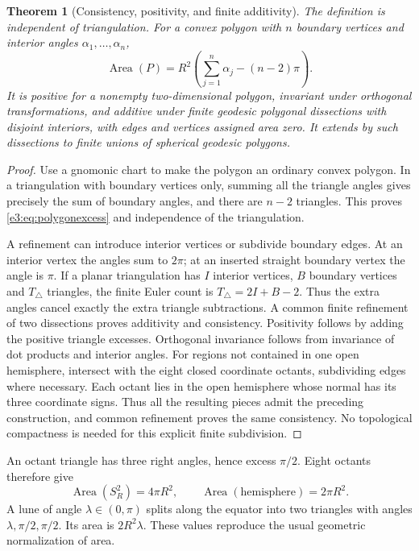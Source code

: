 \documentclass[11pt,letterpaper]{article}
\numberwithin{equation}{section}
\newtheorem{theorem}{Theorem}[section]
\theoremstyle{definition}
\theoremstyle{remark}
\newcommand{\area}{\operatorname{Area}}
\begin{document}
\begin{theorem}[Consistency, positivity, and finite additivity]\label{e3:thm:polygonarea}
The definition is independent of triangulation. For a convex polygon with
$n$ boundary vertices and interior angles $\alpha_1,\ldots,\alpha_n$,
\begin{equation}\label{e3:eq:polygonexcess}
 \area(P)=R^2\left(\sum_{j=1}^n\alpha_j-(n-2)\pi\right).
\end{equation}
It is positive for a nonempty two-dimensional polygon, invariant under
orthogonal transformations, and additive under finite geodesic polygonal
dissections with disjoint interiors, with edges and vertices assigned area zero. It extends by such dissections to finite
unions of spherical geodesic polygons.
\end{theorem}
\begin{proof}
Use a gnomonic chart to make the polygon an ordinary convex polygon.
In a triangulation with boundary vertices only, summing all the triangle
angles gives precisely the sum of boundary angles, and there are $n-2$
triangles. This proves \cref{e3:eq:polygonexcess} and independence of the
triangulation.

A refinement can introduce interior vertices or subdivide boundary edges.
At an interior vertex the angles sum to $2\pi$; at an inserted straight
boundary vertex the angle is $\pi$. If a planar triangulation has $I$
interior vertices, $B$ boundary vertices and $T_\triangle$ triangles, the
finite Euler count is $T_\triangle=2I+B-2$. Thus the extra angles cancel
exactly the extra triangle subtractions. A common finite refinement of two
dissections proves additivity and consistency. Positivity follows by adding
the positive triangle excesses. Orthogonal invariance follows from invariance
of dot products and interior angles. For regions not contained in one open
hemisphere, intersect with the eight closed coordinate octants, subdividing
edges where necessary. Each octant lies in the open hemisphere whose normal
has its three coordinate signs. Thus all the resulting pieces admit the
preceding construction, and common refinement proves the same consistency.
No topological compactness is needed for this explicit finite subdivision.
\end{proof}

An octant triangle has three right angles, hence excess $\pi/2$.
Eight octants therefore give
\begin{equation}\label{e3:eq:spherearea}
 \area(S_R^2)=4\pi R^2,\qquad
 \area(\text{hemisphere})=2\pi R^2.
\end{equation}
A lune of angle $\lambda\in(0,\pi)$ splits along the equator into two
triangles with angles $\lambda,\pi/2,\pi/2$. Its area is $2R^2\lambda$.
These values reproduce the usual geometric normalization of area.
\end{document}
